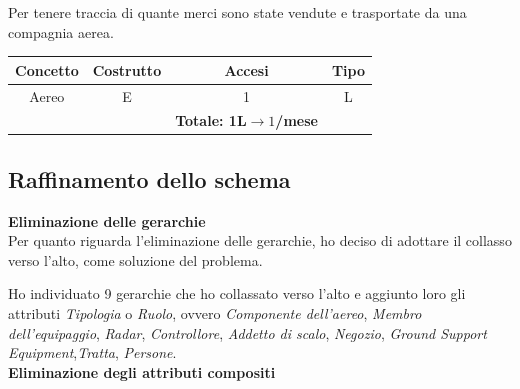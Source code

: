 \textsf{\small Per tenere traccia di quante merci sono state vendute e trasportate da una compagnia aerea.}\break

\begin{tabular}{ c c c c}
	\hline
	\rowcolor{airforceblue}
	\textbf{\color{white}Concetto} & \textbf{\color{white}Costrutto} & \textbf{\color{white}Accesi} & \textbf{\color{white}Tipo}\\
	\hline
	\textsf{\small Aereo} & \textsf{\small E} & \textsf{\small 1} &  \textsf{\small L}\\
	\hline
	\rowcolor{airforceblue}
	\textsf{\small } & \textsf{\small } & \textbf{\color{white}Totale: 1L$\rightarrow 1$/mese } \textsf{\small } & \textsf{\small }\\
	\hline
\end{tabular}



\newpage

\subsection{Raffinamento dello schema}

\textbf{Eliminazione delle gerarchie}\\
\textsf{\small Per quanto riguarda l'eliminazione delle gerarchie, ho deciso di adottare il collasso verso l'alto, come soluzione del problema.}\break 



\textsf{\small Ho individuato 9 gerarchie che ho collassato verso l'alto e aggiunto loro gli attributi \emph{Tipologia} o \emph{Ruolo}, ovvero \emph{Componente dell'aereo}, \emph{Membro dell'equipaggio}, \emph{Radar}, \emph{Controllore}, \emph{Addetto di scalo}, \emph{Negozio}, \emph{Ground Support Equipment},\emph{Tratta}, \emph{Persone}.}\\

\textbf{Eliminazione degli attributi compositi}

